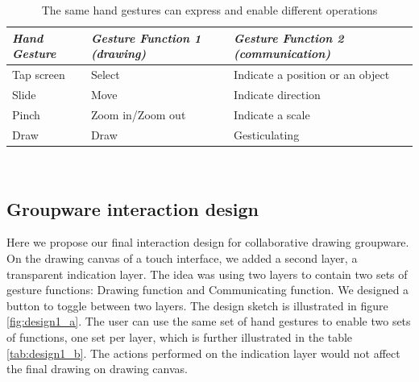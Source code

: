 \documentclass[12pt,twoside]{article}
\begin{document}
\begin{table}
  \centering
  \begin{tabular}{l l l}
    {\small\textit{Hand Gesture}}
    & {\small \textit{Gesture Function 1 (drawing)}}
    & {\small \textit{Gesture Function 2 (communication)}} \\
    \midrule
    Tap screen & Select & Indicate a position or an object \\ 
    Slide & Move & Indicate direction \\ 
    Pinch & Zoom in/Zoom out & Indicate a scale \\
    Draw & Draw & Gesticulating \\ 
  \end{tabular}
  \caption{The same hand gestures can express and enable different operations}~\label{tab:tableconflict}
\end{table}

\subsection{Groupware interaction design}
\label{sec:design}
Here we propose our final interaction design for collaborative drawing groupware. On the drawing canvas of a touch interface, we added a second layer, a transparent indication layer. The idea was using two layers to contain two sets of gesture functions: Drawing function and Communicating function. We designed a button to toggle between two layers. The design sketch is illustrated in figure \ref{fig:design1_a}. The user can use the same set of hand gestures to enable two sets of functions, one set per layer, which is further illustrated in the table \ref{tab:design1_b}. The actions performed on the indication layer would not affect the final drawing on drawing canvas. 
\end{document}
